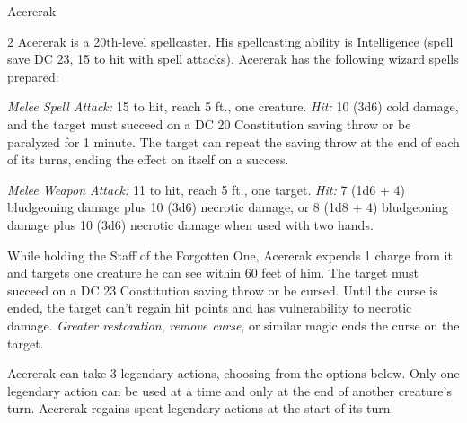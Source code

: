 \documentclass[10pt,a4paper,twoside,bg=print,twocolumn,openany,nodeprecatedcode]{dndbook}
\begin{document}
\begin{DndMonster}[float*=b,width=\textwidth + 8pt]{Acererak}
\begin{multicols}{2}
Acererak is a 20th-level spellcaster. His spellcasting ability is Intelligence (spell save DC 23, 15 to hit with spell attacks). Acererak has the following wizard spells prepared:
\begin{DndMonsterSpells}
\end{DndMonsterSpells}
\textsl{Melee Spell Attack:} 15 to hit, reach 5 ft., one creature. \textsl{Hit:} 10 (3d6) cold damage, and the target must succeed on a DC 20 Constitution saving throw or be paralyzed for 1 minute. The target can repeat the saving throw at the end of each of its turns, ending the effect on itself on a success.

\textsl{Melee Weapon Attack:} 11 to hit, reach 5 ft., one target. \textsl{Hit:} 7 (1d6 + 4) bludgeoning damage plus 10 (3d6) necrotic damage, or 8 (1d8 + 4) bludgeoning damage plus 10 (3d6) necrotic damage when used with two hands.

While holding the Staff of the Forgotten One, Acererak expends 1 charge from it and targets one creature he can see within 60 feet of him. The target must succeed on a DC 23 Constitution saving throw or be cursed. Until the curse is ended, the target can't regain hit points and has vulnerability to necrotic damage. \textit{Greater restoration}, \textit{remove curse}, or similar magic ends the curse on the target.

Acererak can take 3 legendary actions, choosing from the options below. Only one legendary action can be used at a time and only at the end of another creature's turn. Acererak regains spent legendary actions at the start of its turn.


\end{multicols}
\end{DndMonster}
\end{document}
